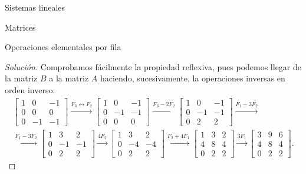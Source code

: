 \documentclass[a4paper,12pt,twoside,spanish,reqno]{amsbook}
\theoremstyle{definition}
\theoremstyle{remark}
\begin{document}
\begin{chapter}{Sistemas lineales}
\begin{section}{Matrices}
\begin{subsection}{Operaciones elementales por fila}
\begin{proof}[Solución]
                    Comprobamos fácilmente la propiedad reflexiva, pues podemos llegar de la matriz $B$ a la matriz $A$ haciendo, sucesivamente, la operaciones inversas en orden inverso:
                    \begin{multline*}
                    \begin{bmatrix}1 & 0& -1 \\ 0&0&0\\  0&-1&-1 \end{bmatrix}
                    \stackrel{F_3\leftrightarrow F_2}{\longrightarrow} 
                    \begin{bmatrix}1 & 0& -1 \\ 0&-1&-1 \\ 0&0&0 \end{bmatrix}
                    \stackrel{F_3 - 2F_2}{\longrightarrow} 
                    \begin{bmatrix}1 & 0& -1 \\ 0&-1&-1 \\ 0&2&2 \end{bmatrix} 
                    \stackrel{F_1 - 3F_2}{\longrightarrow}
                    \\ \stackrel{F_1 - 3F_2}{\longrightarrow}
                    \begin{bmatrix}1 & 3 & 2 \\ 0&-1&-1 \\ 0&2&2 \end{bmatrix}
                    \stackrel{4F_2}{\longrightarrow} 
                    \begin{bmatrix}1 & 3 & 2 \\ 0&-4&-4 \\ 0&2&2 \end{bmatrix} 
                    \stackrel{F_2 +4F_1}{\longrightarrow} 
                    \begin{bmatrix} 1 & 3 & 2 \\ 4&8&4 \\ 0&2&2\end{bmatrix} 
                    \stackrel{3F_1}{\longrightarrow} 
                    \begin{bmatrix} 3 & 9 & 6 \\ 4&8&4 \\ 0&2&2 \end{bmatrix}.
                    \end{multline*}
                \end{proof}
                

\end{subsection}
\end{section}
\end{chapter}
\end{document}
